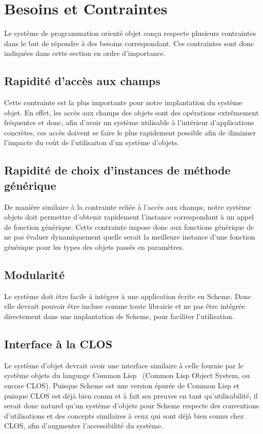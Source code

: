 \documentclass[letterpaper,12pt]{book}
\begin{document}
\clearpage



  \section{Besoins et Contraintes}
    Le système de programmation orienté objet conçu respecte plusieurs
    contraintes dans le but de répondre à des besoins
    correspondant. Ces contraintes sont donc indiquées dans cette
    section en ordre d'importance.

    \subsection{Rapidité d'accès aux champs}
      Cette contrainte est la plus importante pour notre implantation
      du système objet. En effet, les accès aux champs des objets sont
      des opérations extrêmement fréquentes et donc, afin d'avoir un
      système utilisable à l'intérieur d'applications concrètes, ces
      accès doivent se faire le plus rapidement possible afin de
      diminuer l'impacte du coût de l'utilisaiton d'un système
      d'objets.

    \subsection{Rapidité de choix d'instances de méthode générique}
      De manière similaire à la contrainte reliée à l'accès aux
      champs, notre système objets doit permettre d'obtenir rapidement
      l'instance correspondant à un appel de fonction générique. Cette
      contrainte impose donc aux fonctions générique de ne pas évaluer
      dynamiquement quelle serait la meilleure instance d'une fonction
      générique pour les types des objets passés en paramètres.

    \subsection{Modularité}
      Le système doit être facile à intégrer à une application écrite
      en Scheme. Donc elle devrait pouvoir être incluse comme toute
      librairie et ne pas être intégrée directement dans une
      implantation de Scheme, pour faciliter l'utilisation.

    \subsection{Interface à la CLOS}
      Le système d'objet devrait avoir une interface similaire à celle
      fournie par le système objets du language Common
      Lisp~\cite{COMMONLISP} (Common Lisp Object System, ou encore
      CLOS). Puisque Scheme est une version épurée de Common Lisp et
      puisque CLOS est déjà bien connu et à fait ses preuves en tant
      qu'utilisabilité, il serait donc naturel qu'un système d'objets
      pour Scheme respecte des conventions d'utilisations et des
      concepts similaires à ceux qui sont déjà bien connu chez CLOS,
      afin d'augmenter l'accessibilité du système.
    
\end{document}
